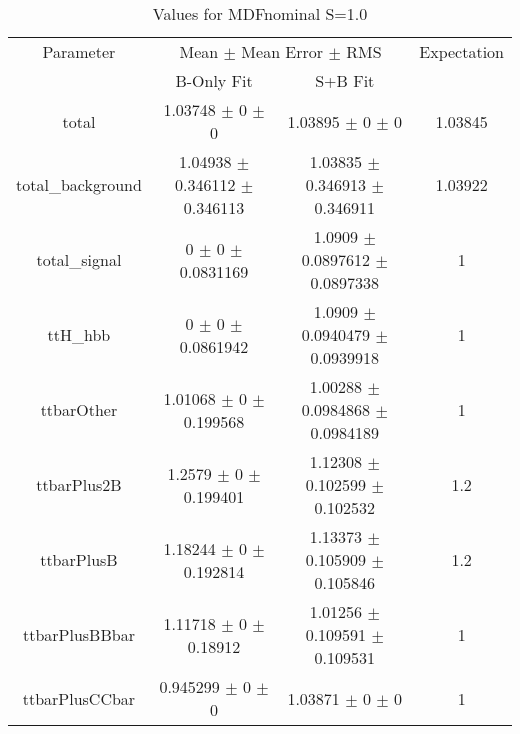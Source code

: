 \begin{table}
\centering
\caption{Values for MDFnominal S=1.0}
\begin{tabular}{cccc}
\toprule
Parameter & \multicolumn{2}{c}{Mean $\pm$ Mean Error $\pm$ RMS} & Expectation\\
 & B-Only Fit & S+B Fit & \\
\midrule
total & \num{1.03748} $\pm$ \num{0} $\pm$ \num{0} & \num{1.03895} $\pm$ \num{0} $\pm$ \num{0} & \num{1.03845}\\
total\_background & \num{1.04938} $\pm$ \num{0.346112} $\pm$ \num{0.346113} & \num{1.03835} $\pm$ \num{0.346913} $\pm$ \num{0.346911} & \num{1.03922}\\
total\_signal & \num{0} $\pm$ \num{0} $\pm$ \num{0.0831169} & \num{1.0909} $\pm$ \num{0.0897612} $\pm$ \num{0.0897338} & \num{1}\\
ttH\_hbb & \num{0} $\pm$ \num{0} $\pm$ \num{0.0861942} & \num{1.0909} $\pm$ \num{0.0940479} $\pm$ \num{0.0939918} & \num{1}\\
ttbarOther & \num{1.01068} $\pm$ \num{0} $\pm$ \num{0.199568} & \num{1.00288} $\pm$ \num{0.0984868} $\pm$ \num{0.0984189} & \num{1}\\
ttbarPlus2B & \num{1.2579} $\pm$ \num{0} $\pm$ \num{0.199401} & \num{1.12308} $\pm$ \num{0.102599} $\pm$ \num{0.102532} & \num{1.2}\\
ttbarPlusB & \num{1.18244} $\pm$ \num{0} $\pm$ \num{0.192814} & \num{1.13373} $\pm$ \num{0.105909} $\pm$ \num{0.105846} & \num{1.2}\\
ttbarPlusBBbar & \num{1.11718} $\pm$ \num{0} $\pm$ \num{0.18912} & \num{1.01256} $\pm$ \num{0.109591} $\pm$ \num{0.109531} & \num{1}\\
ttbarPlusCCbar & \num{0.945299} $\pm$ \num{0} $\pm$ \num{0} & \num{1.03871} $\pm$ \num{0} $\pm$ \num{0} & \num{1}\\
\bottomrule
\end{tabular}
\end{table}